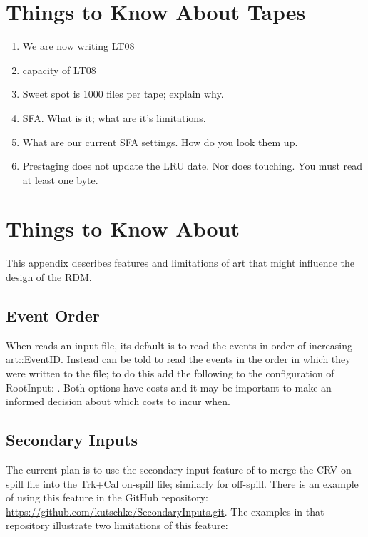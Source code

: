 \chapter{Things to Know About Tapes}
\label{app:AboutTapes}

\begin{enumerate}
  \item We are now writing LT08
  \item capacity of LT08
  \item Sweet spot is 1000 files per tape; explain why.
  \item SFA.  What is it; what are it's limitations.
  \item What are our current SFA settings.  How do you look them up.
  \item Prestaging does not update the LRU date.  Nor does touching.  You must read at least one byte.
\end{enumerate}

\chapter{Things to Know About \art}
\label{app:Aboutart}

This appendix describes features and limitations of art that might influence the design
of the RDM.

\section{Event Order }
\label{appsec:EventOrder}

When \art reads an input file, its default is to read the events in order of increasing {\code art::EventID}.
Instead \art can be told to read the events in the order in which they were written to the file; to do this
add the following to the configuration of {\code RootInput}: .
Both options have costs and it may be important to make an informed decision about which costs to incur when.

\section{Secondary Inputs}
\label{appsec:SecondaryInputs}

The current plan is to use the secondary input feature of \art to merge the CRV on-spill file
into the Trk+Cal on-spill file; similarly for off-spill. There is an example of using this feature in the GitHub repository:
\href{https://github.com/kutschke/SecondaryInputs.git}{https://github.com/kutschke/SecondaryInputs.git}.
The examples in that repository illustrate two limitations of this feature:

